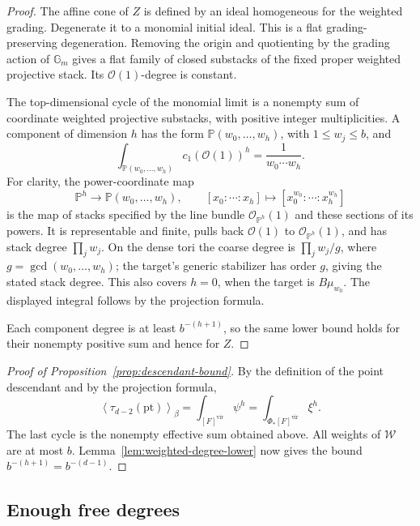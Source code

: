 \begin{proof}
The affine cone of \(Z\) is defined by an ideal homogeneous for the
weighted grading.  Degenerate it to a monomial initial ideal.
This is a flat grading-preserving degeneration.  Removing the
origin and quotienting by the grading action of \(\mathbb G_m\)
gives a flat family of closed substacks of the fixed proper
weighted projective stack.  Its \(\mathcal O(1)\)-degree is constant.

The top-dimensional cycle of the monomial limit is a nonempty sum
of coordinate weighted projective substacks, with positive integer
multiplicities.  A component of dimension \(h\) has the form
\(\mathbb P(w_0,\ldots,w_h)\), with \(1\le w_j\le b\), and
\[
  \int_{\mathbb P(w_0,\ldots,w_h)}
       c_1(\mathcal O(1))^h
   =\frac1{w_0\cdots w_h}.
\]
For clarity, the power-coordinate map
\[
  \mathbb P^h\longrightarrow\mathbb P(w_0,\ldots,w_h),
  \qquad [x_0:\cdots:x_h]\longmapsto
          [x_0^{w_0}:\cdots:x_h^{w_h}]
\]
is the map of stacks specified by the line bundle
\(\mathcal O_{\mathbb P^h}(1)\) and these sections of its powers.
It is representable and finite, pulls back \(\mathcal O(1)\) to
\(\mathcal O_{\mathbb P^h}(1)\), and has stack degree
\(\prod_jw_j\).  On the dense tori the coarse degree is
\(\prod_jw_j/g\), where \(g=\gcd(w_0,\ldots,w_h)\); the target's
generic stabilizer has order \(g\), giving the stated stack degree.
This also covers \(h=0\), when the target is \(B\mu_{w_0}\).
The displayed integral follows by the projection formula.

Each component degree is at least \(b^{-(h+1)}\), so the same lower
bound holds for their nonempty positive sum and hence for \(Z\).
\end{proof}

\begin{proof}[Proof of Proposition~\ref{prop:descendant-bound}]
By the definition of the point descendant and by the projection formula,
\[
  \left\langle\tau_{d-2}(\mathrm{pt})\right\rangle_\beta
  =\int_{[F]^{\mathrm{vir}}}\psi^h
  =\int_{\Phi_*[F]^{\mathrm{vir}}}\xi^h.
\]
The last cycle is the nonempty effective sum obtained above.
All weights of \(\mathcal W\) are at most \(b\).
Lemma~\ref{lem:weighted-degree-lower} now gives the bound
\(b^{-(h+1)}=b^{-(d-1)}\).
\end{proof}

\subsection{Enough free degrees}

